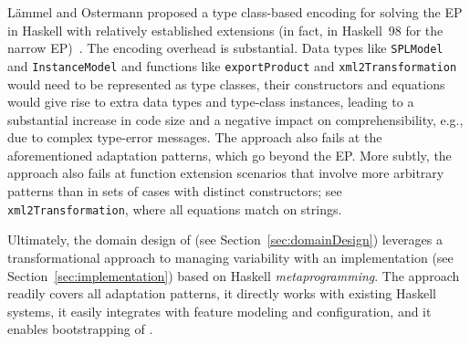 L\"ammel and Ostermann proposed a type class-based encoding for
solving the EP in Haskell with relatively established extensions (in
fact, in Haskell~98 for the narrow EP)~\cite{LaemmelO06}. The encoding
overhead is substantial. Data types like \texttt{SPLModel} and
\texttt{InstanceModel} and functions like \texttt{exportProduct} and
\texttt{xml2Transformation} would need to be represented as type
classes, their constructors and equations would give rise to extra
data types and type-class instances, leading to a substantial increase
in code size and a negative impact on comprehensibility, e.g., due to
complex type-error messages. The approach also fails at the
aforementioned adaptation patterns, which go beyond the EP. More
subtly, the approach also fails at function extension scenarios that
involve more arbitrary patterns than in sets of cases with distinct
constructors; see \texttt{xml2Transformation}, where all equations
match on strings.

Ultimately, the domain design of \hpl{} (see
Section~\ref{sec:domainDesign}) leverages a transformational approach
to managing variability with an implementation (see
Section~\ref{sec:implementation}) based on Haskell
\emph{metaprogramming}. The approach readily covers all adaptation
patterns, it directly works with existing Haskell systems, it easily
integrates with feature modeling and configuration, and it enables
bootstrapping of \hpl{}.

